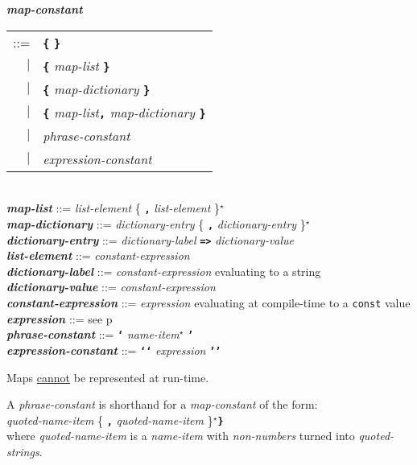 \documentclass[12pt]{article}
\newcommand{\TT}[1]{{\tt \bfseries #1}}
\newcommand{\STAR}{{\Large $^\star$}}
\newcommand{\emkey}[1]{{\em \bfseries #1}}
\newcommand{\pagref}[1]{p\pageref{#1}}
\newenvironment{indpar}[1][0.3in]%
	{\begin{list}{}%
		     {\setlength{\itemsep}{0in}%
		      \setlength{\topsep}{0in}%
		      \setlength{\parsep}{1ex}%
		      \setlength{\labelwidth}{#1}%
		      \setlength{\leftmargin}{#1}%
		      \addtolength{\leftmargin}{\labelsep}}%
	 \item}%
	{\end{list}}
\begin{document}
\begin{indpar}
\emkey{map-constant}\label{MAP-CONSTANT}
    \begin{tabular}[t]{rl}
    ::= & \TT{\{} \TT{\}} \\
    $|$ & \TT{\{} {\em map-list} \TT{\}} \\
    $|$ & \TT{\{} {\em map-dictionary} \TT{\}} \\
    $|$ & \TT{\{} {\em map-list}\TT{,} {\em map-dictionary} \TT{\}} \\
    $|$ & {\em phrase-constant} \\
    $|$ & {\em expression-constant} \\
    \end{tabular}
\\[0.5ex]
\emkey{map-list} ::= {\em list-element} \{ \TT{,} {\em list-element} \}\STAR{}
\\[0.5ex]
\emkey{map-dictionary} ::= {\em dictionary-entry}
                              \{ \TT{,} {\em dictionary-entry} \}\STAR{}
\\[0.5ex]
\emkey{dictionary-entry} ::=
    {\em dictionary-label} \TT{=>} {\em dictionary-value}
\\[0.5ex]
\emkey{list-element}\label{LIST-ELEMENT} ::= {\em constant-expression}
\\[0.5ex]
\emkey{dictionary-label}\label{MAP-LABEL} ::= {\em constant-expression}
    evaluating to a string
\\[0.5ex]
\emkey{dictionary-value}\label{DICTIONARY-VALUE}
    ::= {\em constant-expression}
\\[0.5ex]
\emkey{constant-expression}\label{CONSTANT-EXPRESSION}
    ::= {\em expression} evaluating at compile-time to a {\tt const} value
\\[0.5ex]
\emkey{expression} ::= see \pagref{EXPRESSION}
\\[0.5ex]
\emkey{phrase-constant} ::= \TT{`} {\em name-item}\STAR{} \TT{'}
\\[0.5ex]
\emkey{expression-constant} ::= \TT{`{}`} {\em expression} \TT{'{}'}
\end{indpar}

Maps \underline{cannot} be represented at run-time.

A {\em phrase-constant} is shorthand for a {\em map-constant}
of the form: \\
\hspace*{0.5in}\TT{\{}
    {\em quoted-name-item} \{ \TT{,} {\em quoted-name-item} \}\STAR{}\TT{\}}
\\[0.2ex]
where {\em quoted-name-item} is a {\em name-item} with {\em non-numbers}
turned into {\em quoted-strings}.
\end{document}
